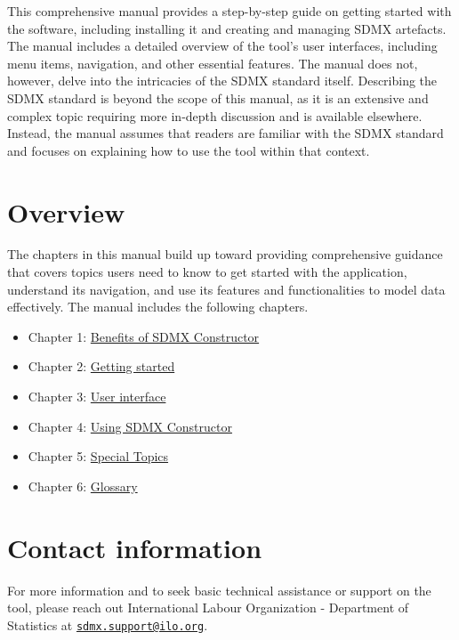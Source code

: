 \documentclass[
]{book}
\providecommand{\tightlist}{%
  \setlength{\itemsep}{0pt}\setlength{\parskip}{0pt}}
\theoremstyle{definition}
\theoremstyle{definition}
\theoremstyle{definition}
\theoremstyle{definition}
\theoremstyle{remark}
\begin{document}
This comprehensive manual provides a step-by-step guide on getting started with the software, including installing it and creating and managing SDMX artefacts. The manual includes a detailed overview of the tool's user interfaces, including menu items, navigation, and other essential features. The manual does not, however, delve into the intricacies of the SDMX standard itself. Describing the SDMX standard is beyond the scope of this manual, as it is an extensive and complex topic requiring more in-depth discussion and is available elsewhere. Instead, the manual assumes that readers are familiar with the SDMX standard and focuses on explaining how to use the tool within that context.

\hypertarget{overview}{%
\section*{Overview}\label{overview}}

The chapters in this manual build up toward providing comprehensive guidance that covers topics users need to know to get started with the application, understand its navigation, and use its features and functionalities to model data effectively. The manual includes the following chapters.

\begin{itemize}
\tightlist
\item
  Chapter 1: \protect\hyperlink{benefits-of}{Benefits of SDMX Constructor}
\item
  Chapter 2: \protect\hyperlink{getting-started}{Getting started}
\item
  Chapter 3: \protect\hyperlink{user-interface}{User interface}
\item
  Chapter 4: \protect\hyperlink{using-sdmx}{Using SDMX Constructor}
\item
  Chapter 5: \protect\hyperlink{special-topics}{Special Topics}
\item
  Chapter 6: \protect\hyperlink{glossary}{Glossary}
\end{itemize}

\hypertarget{contact-information}{%
\section*{Contact information}\label{contact-information}}

For more information and to seek basic technical assistance or support on the tool, please reach out International Labour Organization - Department of Statistics at \href{mailto:sdmx.support@ilo.org}{\nolinkurl{sdmx.support@ilo.org}}.
\end{document}
